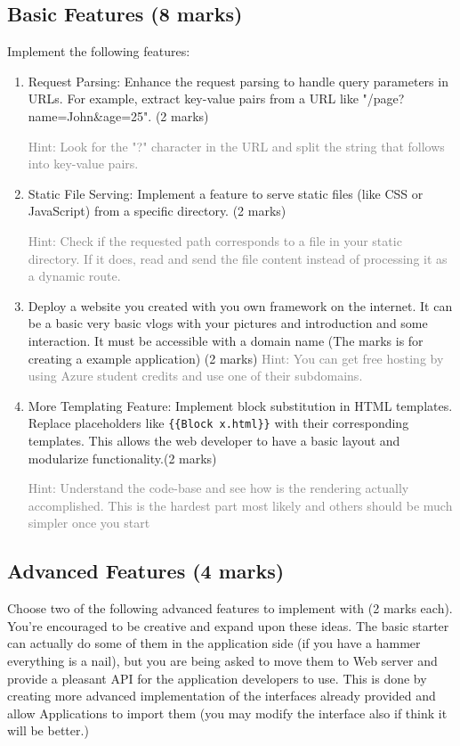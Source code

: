 \documentclass{article}
\begin{document}
\subsection{Basic Features (8 marks)}
Implement the following features:

\begin{enumerate}[label=(\alph*)]
    \item Request Parsing: Enhance the request parsing to handle query parameters in URLs. For example, extract key-value pairs from a URL like "/page?name=John\&age=25". (2 marks)
    
    \textcolor{gray}{Hint: Look for the "?" character in the URL and split the string that follows into key-value pairs.}

    \item Static File Serving: Implement a feature to serve static files (like CSS or JavaScript) from a specific directory. (2 marks)
    
    \textcolor{gray}{Hint: Check if the requested path corresponds to a file in your static directory. If it does, read and send the file content instead of processing it as a dynamic route.}

    \item Deploy a website you created with you own framework on the internet. It can be a basic very basic vlogs with your pictures and introduction and some interaction. It must be accessible with a domain name (The marks is for creating a example application) (2 marks) 
    \textcolor{gray}{Hint: You can get free hosting by using Azure student credits and use one of their subdomains.}

    \item More Templating Feature: Implement block substitution in HTML templates. Replace placeholders like \texttt{\{\{Block x.html\}\}} with their corresponding templates. This allows the web developer to have a basic layout and modularize functionality.(2 marks)
    
    \textcolor{gray}{Hint: Understand the code-base and see how is the rendering actually accomplished. This is the hardest part most likely and others should be much simpler once you start}
\end{enumerate}

\subsection{Advanced Features (4 marks)}
Choose two of the following advanced features to implement with (2 marks each). You're encouraged to be creative and expand upon these ideas. The basic starter can actually do some of them in the application side (if you have a hammer everything is a nail), but you are being asked to move them to Web server and provide a pleasant API for the application developers to use. This is done by creating more advanced implementation of the interfaces already provided and allow Applications to import them (you may modify the interface also if think it will be better.) 
\end{document}
